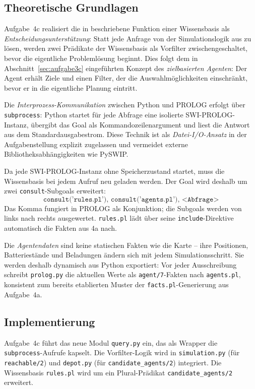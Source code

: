 \subsection{Theoretische Grundlagen}

Aufgabe~4c realisiert die in \textcite[S. 61]{4} beschriebene Funktion einer Wissensbasis als \textit{Entscheidungsunterstützung}: Statt jede Anfrage von der Simulationslogik aus zu lösen, werden zwei Prädikate der Wissensbasis als Vorfilter zwischengeschaltet, bevor die eigentliche Problemlösung beginnt. Dies folgt dem in Abschnitt~\ref{sec:aufgabe3c} eingeführten Konzept des \textit{zielbasierten Agenten}: Der Agent erhält Ziele und einen Filter, der die Auswahlmöglichkeiten einschränkt, bevor er in die eigentliche Planung eintritt.

Die \textit{Interprozess-Kommunikation} zwischen Python und \acs{PROLOG} erfolgt über \texttt{subprocess}: Python startet für jede Abfrage eine isolierte \acs{SWI}-\acs{PROLOG}-Instanz, übergibt das Goal als Kommandozeilenargument und liest die Antwort aus dem Standardausgabestrom. Diese Technik ist als \textit{Datei-I/O-Ansatz} in der Aufgabenstellung explizit zugelassen und vermeidet externe Bibliotheksabhängigkeiten wie PySWIP.

Da jede \acs{SWI}-\acs{PROLOG}-Instanz ohne Speicherzustand startet, muss die Wissensbasis bei jedem Aufruf neu geladen werden. Der Goal wird deshalb um zwei \texttt{consult}-Subgoals erweitert:
\[
\texttt{consult('rules.pl'),\ consult('agents.pl'),\ <Abfrage>}
\]
Das Komma fungiert in \acs{PROLOG} als Konjunktion; die Subgoals werden von links nach rechts ausgewertet. \texttt{rules.pl} lädt über seine \texttt{include}-Direktive automatisch die Fakten aus 4a nach.

Die \textit{Agentendaten} sind keine statischen Fakten wie die Karte -- ihre Positionen, Batteriestände und Beladungen ändern sich mit jedem Simulationsschritt. Sie werden deshalb dynamisch aus Python exportiert: Vor jeder Ausschreibung schreibt \texttt{prolog.py} die aktuellen Werte als \texttt{agent/7}-Fakten nach \texttt{agents.pl}, konsistent zum bereits etablierten Muster der \texttt{facts.pl}-Generierung aus Aufgabe~4a.

\subsection{Implementierung}

Aufgabe~4c führt das neue Modul \texttt{query.py} ein, das als Wrapper die \texttt{subprocess}-Aufrufe kapselt. Die Vorfilter-Logik wird in \texttt{simulation.py} (für \texttt{reachable/2}) und \texttt{depot.py} (für \texttt{candidate\_agents/2}) integriert. Die Wissensbasis \texttt{rules.pl} wird um ein Plural-Prädikat \texttt{candidate\_agents/2} erweitert.

